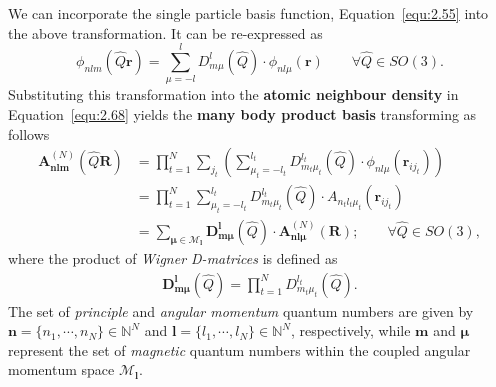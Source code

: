 We can incorporate the single particle basis function, Equation~\eqref{equ:2.55} into the above transformation.
It can be re-expressed as
\begin{equation}
\label{equ:2.72}
\phi_{nlm}(\hat{Q}\textbf{r})
= \sum^{l}_{\mu=-l}
D^{l}_{m\mu}(\hat{Q})\cdot
\phi_{nl\mu}(\textbf{r})
\quad\quad\forall\hat{Q} \in SO(3).
\end{equation}
Substituting this transformation into the \textbf{atomic neighbour density} in Equation~\eqref{equ:2.68} yields the \textbf{many body product basis} transforming as follows
\begin{equation}
\label{equ:2.73}
\begin{split}
\textbf{A}^{(N)}_{\mathbf{nlm}}(\hat{Q}\mathbf{R})&=
\prod_{t=1}^{N}
\sum_{j_{t}}
\left(
\sum^{l_{t}}_{\mu_{t}=-l_{t}}
D^{l_{t}}_{m_{t}\mu_{t}}(\hat{Q})\cdot
\phi_{nl\mu}(\textbf{r}_{ij_{t}})
\right)
\\ &
=\prod_{t=1}^{N}
\sum^{l_{t}}_{\mu_{t}=-l_{t}}
D^{l_{t}}_{m_{t}\mu_{t}}(\hat{Q})\cdot
A_{n_{t}l_{t}\mu_{t}}(\mathbf{r}_{ij_{t}})
\\ &
=\sum_{\boldsymbol{\mu}\in\mathcal{M}_{\textbf{l}}}
\mathbf{D}^{\textbf{l}}_{\textbf{m}\boldsymbol{\mu}}(\hat{Q})\cdot
\textbf{A}^{(N)}_{\mathbf{nl}\boldsymbol{\mu}}(\mathbf{R});
\quad\quad\forall\hat{Q} \in SO(3),
\end{split}
\end{equation}
where the product of \textit{Wigner D-matrices} is defined as
\begin{equation}
\label{equ:2.74}
\begin{split}
\mathbf{D}^{\textbf{l}}_{\textbf{m}\boldsymbol{\mu}}(\hat{Q}) = \prod_{t=1}^{N}D^{l_{t}}_{m_{t}\mu_{t}}(\hat{Q}).
\end{split}
\end{equation}
The set of \textit{principle} and \textit{angular momentum} quantum numbers are given by
$\mathbf{n}=\{{n}_{1},\cdots,{n}_{N}\}\in\mathbb{N}^{N}$ and $\mathbf{l}=\{{l}_{1},\cdots,{l}_{N}\}\in\mathbb{N}^{N}$, respectively,
while $\mathbf{m}$ and $\boldsymbol{\mu}$ represent the set of \textit{magnetic} quantum numbers within the coupled angular momentum space $\mathcal{M}_{\textbf{l}}$.

